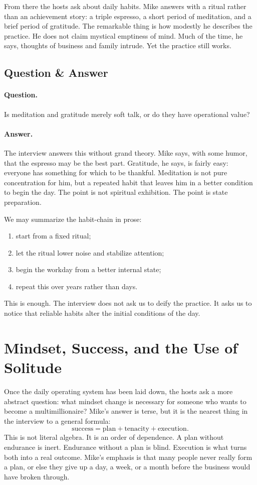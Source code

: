 From there the hosts ask about daily habits. Mike answers with a ritual rather than an achievement story: a triple espresso, a short period of meditation, and a brief period of gratitude. The remarkable thing is how modestly he describes the practice. He does not claim mystical emptiness of mind. Much of the time, he says, thoughts of business and family intrude. Yet the practice still works.

\subsection{Question \& Answer}

\paragraph{Question.} Is meditation and gratitude merely soft talk, or do they have operational value?

\paragraph{Answer.} The interview answers this without grand theory. Mike says, with some humor, that the espresso may be the best part. Gratitude, he says, is fairly easy: everyone has something for which to be thankful. Meditation is not pure concentration for him, but a repeated habit that leaves him in a better condition to begin the day. The point is not spiritual exhibition. The point is state preparation.

We may summarize the habit-chain in prose:
\begin{enumerate}
\item start from a fixed ritual;
\item let the ritual lower noise and stabilize attention;
\item begin the workday from a better internal state;
\item repeat this over years rather than days.
\end{enumerate}
This is enough. The interview does not ask us to deify the practice. It asks us to notice that reliable habits alter the initial conditions of the day.

\section{Mindset, Success, and the Use of Solitude}

Once the daily operating system has been laid down, the hosts ask a more abstract question: what mindset change is necessary for someone who wants to become a multimillionaire? Mike's answer is terse, but it is the nearest thing in the interview to a general formula:
\begin{equation}
\text{success}=\text{plan}+\text{tenacity}+\text{execution}.
\end{equation}
This is not literal algebra. It is an order of dependence. A plan without endurance is inert. Endurance without a plan is blind. Execution is what turns both into a real outcome. Mike's emphasis is that many people never really form a plan, or else they give up a day, a week, or a month before the business would have broken through.

